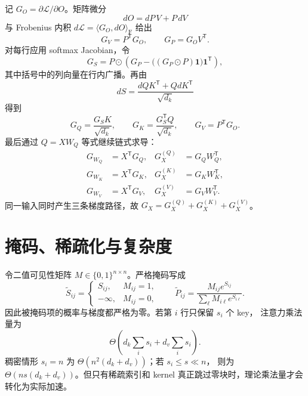 \documentclass[11pt]{article}
\numberwithin{equation}{section}
\newcommand{\1}{\mathbf{1}}
\newcommand{\T}{\mathsf{T}}
\newcommand{\F}{\mathrm{F}}
\newcommand{\cL}{\mathcal{L}}
\begin{document}
记 $G_O=\partial\cL/\partial O$。矩阵微分
\begin{equation}
 dO=dP\,V+P\,dV
\end{equation}
与 Frobenius 内积 $d\cL=\langle G_O,dO\rangle_\F$ 给出
\begin{equation}
 G_V=P^\T G_O,
 \qquad
 G_P=G_O V^\T.
\end{equation}
对每行应用 softmax Jacobian，令
\begin{equation}
 G_S=P\odot\left(G_P-\bigl((G_P\odot P)\1\bigr)\1^\T\right),
\end{equation}
其中括号中的列向量在行内广播。再由
\begin{equation}
 dS=\frac{dQK^\T+QdK^\T}{\sqrt{d_k}}
\end{equation}
得到
\begin{equation}
 \boxed{
 G_Q=\frac{G_SK}{\sqrt{d_k}},\qquad
 G_K=\frac{G_S^{\T}Q}{\sqrt{d_k}},\qquad
 G_V=P^{\T}G_O.}
\end{equation}
最后通过 $Q=XW_Q$ 等式继续链式求导：
\begin{align}
 G_{W_Q}&=X^{\T}G_Q,&G_X^{(Q)}&=G_QW_Q^\T,\\
 G_{W_K}&=X^{\T}G_K,&G_X^{(K)}&=G_KW_K^\T,\\
 G_{W_V}&=X^{\T}G_V,&G_X^{(V)}&=G_VW_V^\T.
\end{align}
同一输入同时产生三条梯度路径，故
$G_X=G_X^{(Q)}+G_X^{(K)}+G_X^{(V)}$。

\section{掩码、稀疏化与复杂度}

令二值可见性矩阵 $M\in\{0,1\}^{n\times n}$。严格掩码写成
\begin{equation}
 \widetilde S_{ij}=
 \begin{cases}
 S_{ij},&M_{ij}=1,\\
 -\infty,&M_{ij}=0,
 \end{cases}
 \qquad
 \widetilde P_{ij}=\frac{M_{ij}e^{S_{ij}}}
 {\sum_\ell M_{i\ell}e^{S_{i\ell}}}.
\end{equation}
因此被掩码项的概率与梯度都严格为零。若第 $i$ 行只保留 $s_i$ 个 key，
注意力乘法量为
\begin{equation}
 \Theta\!\left(d_k\sum_i s_i+d_v\sum_i s_i\right).
\end{equation}
稠密情形 $s_i=n$ 为 $\Theta(n^2(d_k+d_v))$；若 $s_i\le s\ll n$，
则为 $\Theta(ns(d_k+d_v))$。但只有稀疏索引和 kernel 真正跳过零块时，理论乘法量才会转化为实际加速。
\end{document}
